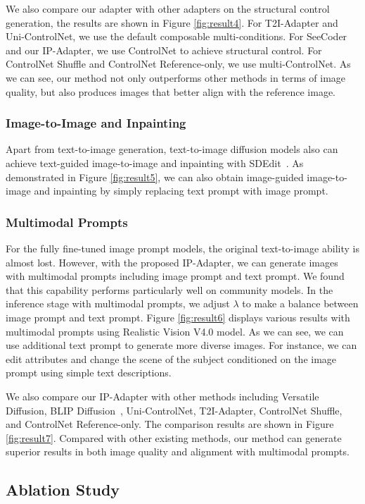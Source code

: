 \documentclass{article}
\begin{document}
We also compare our adapter with other adapters on the structural control generation, the results are shown in Figure \ref{fig:result4}. For T2I-Adapter and Uni-ControlNet, we use the default composable multi-conditions. For SeeCoder and our IP-Adapter, we use ControlNet to achieve structural control. For ControlNet Shuffle and ControlNet Reference-only, we use multi-ControlNet. As we can see, our method not only outperforms other methods in terms of image quality, but also produces images that better align with the reference image.
\subsubsection{Image-to-Image and Inpainting}
Apart from text-to-image generation, text-to-image diffusion models also can achieve text-guided image-to-image and inpainting with SDEdit~\cite{meng2021sdedit}. As demonstrated in Figure \ref{fig:result5}, we can also obtain image-guided image-to-image and inpainting by simply replacing text prompt with image prompt.
\subsubsection{Multimodal Prompts}
For the fully fine-tuned image prompt models, the original text-to-image ability is almost lost. However, with the proposed IP-Adapter, we can generate images with multimodal prompts including image prompt and text prompt. We found that this capability performs particularly well on community models. In the inference stage with multimodal prompts, we adjust $\lambda$ to make a balance between image prompt and text prompt. Figure \ref{fig:result6} displays various results with multimodal prompts using Realistic Vision V4.0 model. As we can see, we can use additional text prompt to generate more diverse images. For instance, we can edit attributes and change the scene of the subject conditioned on the image prompt using simple text descriptions.

We also compare our IP-Adapter with other methods including Versatile Diffusion, BLIP Diffusion~\cite{li2023blip}, Uni-ControlNet, T2I-Adapter, ControlNet Shuffle, and ControlNet Reference-only. The comparison results are shown in Figure \ref{fig:result7}. Compared with other existing methods, our method can generate superior results in both image quality and alignment with multimodal prompts.

\subsection{Ablation Study}
\end{document}
